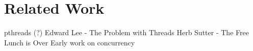 \section{Related Work\label{related_work}}

pthreads (?)
Edward Lee - The Problem with Threads
Herb Sutter - The Free Lunch is Over
Early work on concurrency
